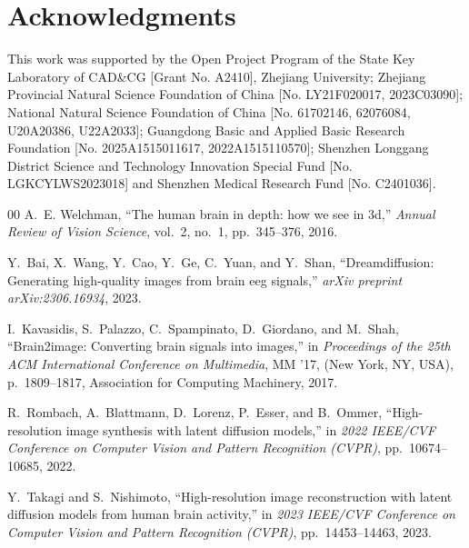 \documentclass[conference]{IEEEtran}
\begin{document}
\section{Acknowledgments}
This work was supported by the Open Project Program of the State Key Laboratory of CAD\&CG [Grant No. A2410], Zhejiang University; Zhejiang Provincial Natural Science Foundation of China [No. LY21F020017, 2023C03090]; National Natural Science Foundation of China [No. 61702146, 62076084, U20A20386, U22A2033]; Guangdong Basic and Applied Basic Research Foundation [No. 2025A1515011617, 2022A1515110570]; Shenzhen Longgang District Science and Technology Innovation Special Fund [No. LGKCYLWS2023018] and Shenzhen Medical Research Fund [No. C2401036].



\begin{thebibliography}{00}
A.~E. Welchman, ``The human brain in depth: how we see in 3d,'' {\em Annual Review of Vision Science}, vol.~2, no.~1, pp.~345--376, 2016.

 Y.~Bai, X.~Wang, Y.~Cao, Y.~Ge, C.~Yuan, and Y.~Shan, ``Dreamdiffusion: Generating high-quality images from brain eeg signals,'' {\em arXiv preprint arXiv:2306.16934}, 2023.


 I.~Kavasidis, S.~Palazzo, C.~Spampinato, D.~Giordano, and M.~Shah, ``Brain2image: Converting brain signals into images,'' in {\em Proceedings of the 25th ACM International Conference on Multimedia}, MM '17, (New York, NY, USA), p.~1809–1817, Association for Computing Machinery, 2017.





 R.~Rombach, A.~Blattmann, D.~Lorenz, P.~Esser, and B.~Ommer, ``High-resolution image synthesis with latent diffusion models,'' in {\em 2022 IEEE/CVF Conference on Computer Vision and Pattern Recognition (CVPR)}, pp.~10674--10685, 2022.



 Y.~Takagi and S.~Nishimoto, ``High-resolution image reconstruction with latent diffusion models from human brain activity,'' in {\em 2023 IEEE/CVF Conference on Computer Vision and Pattern Recognition (CVPR)}, pp.~14453--14463, 2023.




\end{thebibliography}
\end{document}
